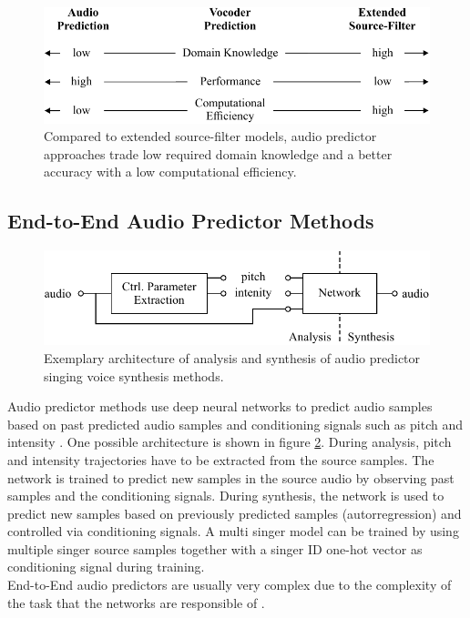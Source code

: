 \begin{figure}[H]
    \centering
    \includegraphics{Graphics/006_method_compairson.pdf}
    \caption{Compared to extended source-filter models, audio predictor approaches trade low required domain knowledge and a better accuracy with a low computational efficiency.}
    \label{fig:method_comparison}
\end{figure}

\subsection{End-to-End Audio Predictor Methods}

\begin{figure}[H]
    \centering
    \includegraphics{Graphics/007_method_audio_predictor.pdf}
    \caption{Exemplary architecture of analysis and synthesis of audio predictor  singing voice synthesis methods.}
    \label{fig:method_audio_predictor}
\end{figure}

Audio predictor methods use deep neural networks to predict audio samples based on past predicted audio samples and conditioning signals such as pitch and intensity \cite{oord_wavenet:_2016}. One possible architecture is shown in figure \ref{fig:method_audio_predictor}. During analysis, pitch and intensity trajectories have to be extracted from the source samples. The network is trained to predict new samples in the source audio by observing past samples and the conditioning signals. During synthesis, the network is used to predict new samples based on previously predicted samples (autorregression) and controlled via conditioning signals. A multi singer model can be trained by using multiple singer source samples together with a singer ID one-hot vector as conditioning signal during training. \\
End-to-End audio predictors are usually very complex due to the complexity of the task that the networks are responsible of \cite{engel_ddsp:_2020}.

